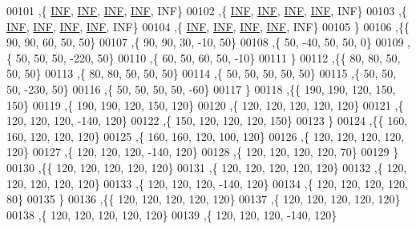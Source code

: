 \begin{DoxyCode}
00101   ,\{   \hyperlink{constants_8h_a12c2040f25d8e3a7b9e1c2024c618cb6}{INF},   \hyperlink{constants_8h_a12c2040f25d8e3a7b9e1c2024c618cb6}{INF},   \hyperlink{constants_8h_a12c2040f25d8e3a7b9e1c2024c618cb6}{INF},   \hyperlink{constants_8h_a12c2040f25d8e3a7b9e1c2024c618cb6}{INF},   INF\}
00102   ,\{   \hyperlink{constants_8h_a12c2040f25d8e3a7b9e1c2024c618cb6}{INF},   \hyperlink{constants_8h_a12c2040f25d8e3a7b9e1c2024c618cb6}{INF},   \hyperlink{constants_8h_a12c2040f25d8e3a7b9e1c2024c618cb6}{INF},   \hyperlink{constants_8h_a12c2040f25d8e3a7b9e1c2024c618cb6}{INF},   INF\}
00103   ,\{   \hyperlink{constants_8h_a12c2040f25d8e3a7b9e1c2024c618cb6}{INF},   \hyperlink{constants_8h_a12c2040f25d8e3a7b9e1c2024c618cb6}{INF},   \hyperlink{constants_8h_a12c2040f25d8e3a7b9e1c2024c618cb6}{INF},   \hyperlink{constants_8h_a12c2040f25d8e3a7b9e1c2024c618cb6}{INF},   INF\}
00104   ,\{   \hyperlink{constants_8h_a12c2040f25d8e3a7b9e1c2024c618cb6}{INF},   \hyperlink{constants_8h_a12c2040f25d8e3a7b9e1c2024c618cb6}{INF},   \hyperlink{constants_8h_a12c2040f25d8e3a7b9e1c2024c618cb6}{INF},   \hyperlink{constants_8h_a12c2040f25d8e3a7b9e1c2024c618cb6}{INF},   INF\}
00105   \}
00106  ,\{\{    90,    90,    60,    50,    50\}
00107   ,\{    90,    90,    30,   -10,    50\}
00108   ,\{    50,   -40,    50,    50,     0\}
00109   ,\{    50,    50,    50,  -220,    50\}
00110   ,\{    60,    50,    60,    50,   -10\}
00111   \}
00112  ,\{\{    80,    80,    50,    50,    50\}
00113   ,\{    80,    80,    50,    50,    50\}
00114   ,\{    50,    50,    50,    50,    50\}
00115   ,\{    50,    50,    50,  -230,    50\}
00116   ,\{    50,    50,    50,    50,   -60\}
00117   \}
00118  ,\{\{   190,   190,   120,   150,   150\}
00119   ,\{   190,   190,   120,   150,   120\}
00120   ,\{   120,   120,   120,   120,   120\}
00121   ,\{   120,   120,   120,  -140,   120\}
00122   ,\{   150,   120,   120,   120,   150\}
00123   \}
00124  ,\{\{   160,   160,   120,   120,   120\}
00125   ,\{   160,   160,   120,   100,   120\}
00126   ,\{   120,   120,   120,   120,   120\}
00127   ,\{   120,   120,   120,  -140,   120\}
00128   ,\{   120,   120,   120,   120,    70\}
00129   \}
00130  ,\{\{   120,   120,   120,   120,   120\}
00131   ,\{   120,   120,   120,   120,   120\}
00132   ,\{   120,   120,   120,   120,   120\}
00133   ,\{   120,   120,   120,  -140,   120\}
00134   ,\{   120,   120,   120,   120,    80\}
00135   \}
00136  ,\{\{   120,   120,   120,   120,   120\}
00137   ,\{   120,   120,   120,   120,   120\}
00138   ,\{   120,   120,   120,   120,   120\}
00139   ,\{   120,   120,   120,  -140,   120\}

\end{DoxyCode}
